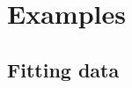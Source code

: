 \documentclass[iop,floatfix]{emulateapj}
\begin{document}


\section{Examples}
\label{sec:examples}

\subsection{Fitting data}
\end{document}
